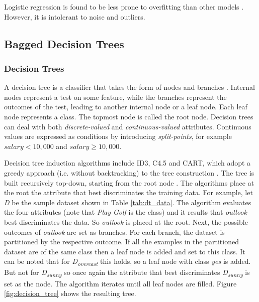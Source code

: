 \documentclass{article}[paper=a4,pagesize=auto,10pt]
\begin{document}
Logistic regression is found to be less prone to overfitting than other models \cite{dreiseitl2002logistic}. However, it is intolerant to noise and outliers.

\subsection{Bagged Decision Trees} \label{Bagged Decision Trees}

\subsubsection{Decision Trees} \label{Decision Trees}

A decision tree is a classifier that takes the form of nodes and branches \cite{han2011data}. Internal nodes represent a test on some feature, while the branches represent the outcomes of the test, leading to another internal node or a leaf node. Each leaf node represents a class. The topmost node is called the root node. Decision trees can deal with both \textit{discrete-valued} and \textit{continuous-valued} attributes. Continuous values are expressed as conditions by introducing \textit{split-points}, for example $salary<10,000$ and $salary\geq10,000$.  \medskip

Decision tree induction algorithms include ID3, C4.5 and CART, which adopt a greedy approach (i.e. without backtracking) to the tree construction \cite{han2011data}. The tree is built recursively top-down, starting from the root node \cite{sammut2017encyclopedia,han2011data}. The algorithms place at the root the attribute that best discriminates the training data. For example, let \textit{D} be the sample dataset shown in Table \ref{tab:dt_data}. The algorithm evaluates the four attributes (note that \textit{Play Golf} is the class) and it results that \textit{outlook} best discriminates the data. So \textit{outlook} is placed at the root. Next, the possible outcomes of \textit{outlook} are set as branches. For each branch, the dataset is partitioned by the respective outcome. If all the examples in the partitioned dataset are of the same class then a leaf node is added and set to this class. It can be noted that for \textit{D\textsubscript{overcast}} this holds, so a leaf node with class \textit{yes} is added. But not for \textit{D\textsubscript{sunny}} so once again the attribute that best discriminates \textit{D\textsubscript{sunny}} is set as the node. The algorithm iterates until all leaf nodes are filled. Figure \ref{fig:decision_tree} shows the resulting tree. \medskip
\end{document}
